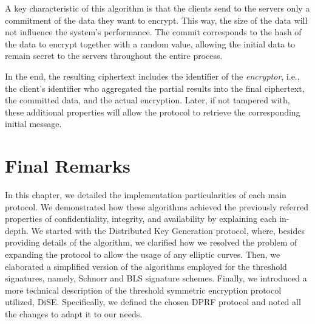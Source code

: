 A key characteristic of this algorithm is that the clients send to the servers only a commitment of the data they want to encrypt. This way, the size of the data will not influence the system's performance. The commit corresponds to the hash of the data to encrypt together with a random value, allowing the initial data to remain secret to the servers throughout the entire process.

In the end, the resulting ciphertext includes the identifier of the \textit{encryptor}, i.e., the client's identifier who aggregated the partial results into the final ciphertext, the committed data, and the actual encryption. Later, if not tampered with, these additional properties will allow the protocol to retrieve the corresponding initial message.

\section{Final Remarks} \label{sec:impl-final-remarks}

In this chapter, we detailed the implementation particularities of each main protocol. We demonstrated how these algorithms achieved the previously referred properties of confidentiality, integrity, and availability by explaining each in-depth. We started with the Distributed Key Generation protocol, where, besides providing details of the algorithm, we clarified how we resolved the problem of expanding the protocol to allow the usage of any elliptic curves. Then, we elaborated a simplified version of the algorithms employed for the threshold signatures, namely, Schnorr and BLS signature schemes. Finally, we introduced a more technical description of the threshold symmetric encryption protocol utilized, DiSE. Specifically, we defined the chosen DPRF protocol and noted all the changes to adapt it to our needs. 

